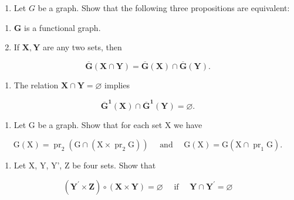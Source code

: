 \exercisegroup

\begin{enumerate}
\def\labelenumi{\arabic{enumi}.}
\tightlist
\item
  Let \(G\) be a graph. Show that the following three propositions are equivalent:
\end{enumerate}

\begin{enumerate}
\def\labelenumi{(\alph{enumi})}
\item
  \(\mathbf{G}\) is a functional graph.
\item
  If \(\mathbf{X},\mathbf{Y}\) are any two sets, then
\end{enumerate}

\[
\overline {{{\mathbf {G}}}} (\mathbf {X} \cap \mathbf {Y}) = \overline {{{\mathbf {G}}}} (\mathbf {X}) \cap \overline {{{\mathbf {G}}}} (\mathbf {Y}).
\]

\begin{enumerate}
\def\labelenumi{(\alph{enumi})}
\setcounter{enumi}{2}
\tightlist
\item
  The relation \(\mathbf{X} \cap \mathbf{Y} = \varnothing\) implies
\end{enumerate}

\[
\overline {{\mathbf {G}}} ^ {\mathbf {1}} (\mathbf {X}) \cap \overline {{\mathbf {G}}} ^ {\mathbf {1}} (\mathbf {Y}) = \varnothing .
\]

\begin{enumerate}
\def\labelenumi{\arabic{enumi}.}
\setcounter{enumi}{1}
\tightlist
\item
  Let G be a graph. Show that for each set X we have
\end{enumerate}

\[
\mathrm{G} (\mathrm{X}) = \operatorname{pr} _ {2} (\mathrm{G} \cap (\mathrm{X} \times \operatorname{pr} _ {2} \mathrm{G})) \quad \text { and } \quad \mathrm{G} (\mathrm{X}) = \mathrm{G} (\mathrm{X} \cap \operatorname{pr} _ {1} \mathrm{G}).
\]

\begin{enumerate}
\def\labelenumi{\arabic{enumi}.}
\setcounter{enumi}{2}
\tightlist
\item
  Let X, Y, Y', Z be four sets. Show that
\end{enumerate}

\[
(\mathbf {Y} ^ {\prime} \times \mathbf {Z}) \circ (\mathbf {X} \times \mathbf {Y}) = \varnothing \quad \text { if } \quad \mathbf {Y} \cap \mathbf {Y} ^ {\prime} = \varnothing
\]

